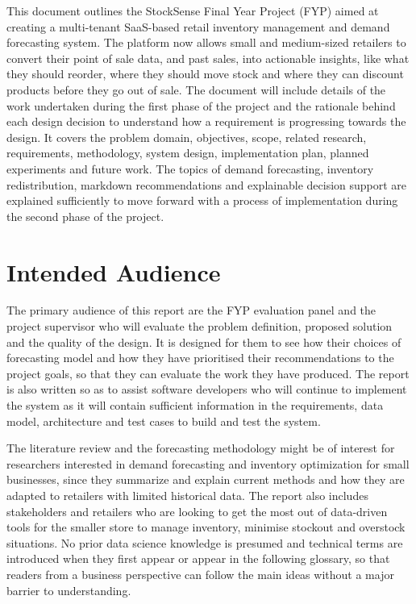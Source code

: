 \documentclass{StockSense}
\begin{document}
This document outlines the StockSense Final Year Project (FYP) aimed at creating a multi-tenant SaaS-based retail inventory management and demand forecasting system. The platform now allows small and medium-sized retailers to convert their point of sale data, and past sales, into actionable insights, like what they should reorder, where they should move stock and where they can discount products before they go out of sale. The document will include details of the work undertaken during the first phase of the project and the rationale behind each design decision to understand how a requirement is progressing towards the design. It covers the problem domain, objectives, scope, related research, requirements, methodology, system design, implementation plan, planned experiments and future work. The topics of demand forecasting, inventory redistribution, markdown recommendations and explainable decision support are explained sufficiently to move forward with a process of implementation during the second phase of the project.

\section{Intended Audience}

The primary audience of this report are the FYP evaluation panel and the project supervisor who will evaluate the problem definition, proposed solution and the quality of the design. It is designed for them to see how their choices of forecasting model and how they have prioritised their recommendations to the project goals, so that they can evaluate the work they have produced. The report is also written so as to assist software developers who will continue to implement the system as it will contain sufficient information in the requirements, data model, architecture and test cases to build and test the system.

The literature review and the forecasting methodology might be of interest for researchers interested in demand forecasting and inventory optimization for small businesses, since they summarize and explain current methods and how they are adapted to retailers with limited historical data. The report also includes stakeholders and retailers who are looking to get the most out of data-driven tools for the smaller store to manage inventory, minimise stockout and overstock situations. No prior data science knowledge is presumed and technical terms are introduced when they first appear or appear in the following glossary, so that readers from a business perspective can follow the main ideas without a major barrier to understanding.
\end{document}
